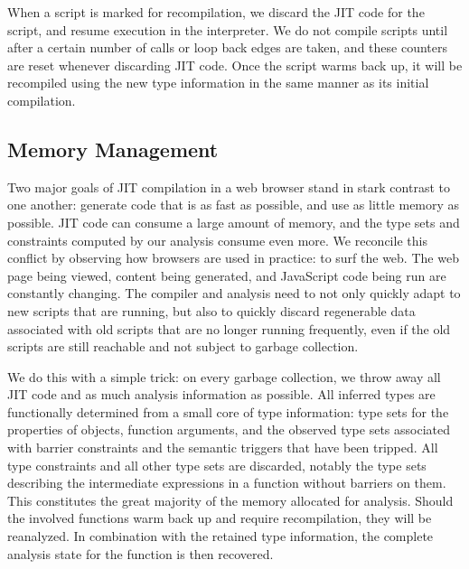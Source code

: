 When a script is marked for recompilation, we
discard the JIT code for the script, and resume execution in the
interpreter.
We do not compile scripts until after a certain number of calls or loop back
edges are taken, and these counters are reset whenever discarding JIT code.
Once the script warms back up, it will be recompiled using the new type information
in the same manner as its initial compilation.

\subsection{Memory Management}
\label{sec:memory}

Two major goals of JIT compilation in a web browser stand in stark contrast
to one another: generate code that is as fast as possible, and use as little
memory as possible.
JIT code can consume a large amount of memory, and the type sets and constraints
computed by our analysis consume even more.
We reconcile this conflict by observing how browsers are used in practice:
to surf the web.
The web page being viewed, content being generated, and JavaScript code being
run are constantly changing.
The compiler and analysis need to not only quickly adapt to new scripts that are
running, but also to quickly discard regenerable data associated with
old scripts that are no longer running frequently, even if the old scripts are still
reachable and not subject to garbage collection.

We do this with a simple trick:
on every garbage collection, we throw away all JIT code and as much analysis
information as possible.
All inferred types are functionally determined from a small core of type
information:
type sets for the properties of objects, function arguments, and the observed
type sets associated with barrier constraints and the semantic triggers that
have been tripped.
All type constraints and all other type sets are discarded, notably the type sets
describing the intermediate expressions in a function without barriers on them.
This constitutes the great majority of the memory allocated for analysis.
Should the involved functions warm back up and require recompilation,
they will be reanalyzed. In combination with the retained type information,
the complete analysis state for the function is then recovered.

